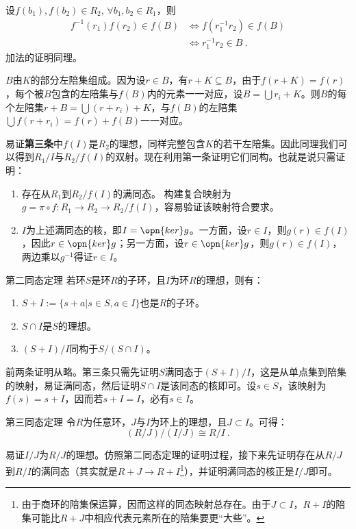 设$f(b_1),f(b_2)\in R_2,\,\forall b_1,b_2\in R_1$，则
\begin{equation}
\begin{aligned}
f^{-1}(r_1)f(r_2)\in f(B)&\Leftrightarrow f(r_1^{-1}r_2)\in f(B)\\
&\Leftrightarrow r_1^{-1}r_2\in B~.
\end{aligned}
\end{equation}
加法的证明同理。

$B$由$K$的部分左陪集组成。因为设$r\in B$，有$r+K\subseteq B$，由于$f(r+K)=f(r)$，每个被$B$包含的左陪集与$f(B)$内的元素一一对应，设$B=\bigcup r_i+K$。则$B$的每个左陪集$r+B=\bigcup (r+r_i)+K$，与$f(B)$的左陪集$\bigcup f(r+r_i)=f(r)+f(B)$一一对应。

易证\textbf{第三条}中$f(I)$是$R_2$的理想，同样完整包含$K$的若干左陪集。因此同理我们可以得到$R_1/I$与$R_2/f(I)$的双射。现在利用第一条证明它们同构。也就是说只需证明：
\begin{enumerate}
\item 存在从$R_1$到$R_2/f(I)$的满同态。
构建复合映射为$g=\pi\circ f:R_1\rightarrow R_2\rightarrow R_2/f(I)$，容易验证该映射符合要求。
\item $I$为上述满同态的核，即$I=\opn{ker}g$。一方面，设$r\in I$，则$g(r)\in f(I)$，因此$r\in \opn{ker}g$；另一方面，设$r\in \opn{ker}g$，则$g(r)\in f(I)$，两边乘以$g^{-1}$得证$r\in I$。
\end{enumerate}
\begin{theorem}{第二同态定理}
若环$S$是环$R$的子环，且$I$为环$R$的理想，则有：
\begin{enumerate}
\item $S+I:=\{s+a|s\in S,a\in I\}$也是$R$的子环。
\item $S\cap I$是$S$的理想。
\item $(S+I)/I$同构于$S/(S\cap I)$。
\end{enumerate}
\end{theorem}
前两条证明从略。第三条只需先证明$S$满同态于$(S+I)/I$，这是从单点集到陪集的映射，易证满同态，然后证明$S\cap I$是该同态的核即可。设$s\in S$，该映射为$f(s)=s+I$，因而若$s+I=I$，必有$s\in I$。
\begin{theorem}{第三同态定理}
令$R$为任意环，$J$与$I$为环上的理想，且$J\subset I$。可得：
\begin{equation}
(R/J)/(I/J)\cong R/I~.
\end{equation}
\end{theorem}
易证$I/J$为$R/J$的理想。仿照第二同态定理的证明过程，接下来先证明存在从$R/J$到$R/I$的满同态（其实就是$R+J\rightarrow R+I$\footnote{由于商环的陪集保运算，因而这样的同态映射总存在。由于$J\subset I$，$R+I$的陪集可能比$R+J$中相应代表元素所在的陪集要更“大些”。}），并证明满同态的核正是$I/J$即可。



